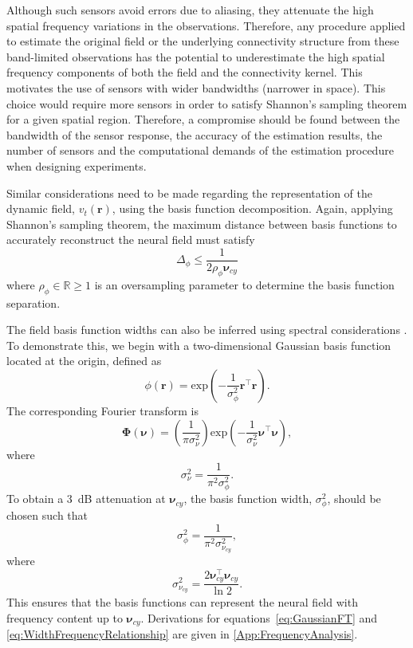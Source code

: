 \documentclass[review,authoryear,3p]{elsarticle}
\begin{document}
Although such sensors avoid errors due to aliasing, they attenuate the high spatial frequency variations in the observations. Therefore, any procedure applied to estimate the original field or the underlying connectivity structure from these band-limited observations has the potential to underestimate the high spatial frequency components of both the field and the connectivity kernel. This motivates the use of sensors with wider bandwidths (narrower in space). This choice would require more sensors in order to satisfy Shannon's sampling theorem for a given spatial region. Therefore, a compromise should be found between the bandwidth of the sensor response, the accuracy of the estimation results, the number of sensors and the computational demands of the estimation procedure when designing experiments.

Similar considerations need to be made regarding the representation of the dynamic field, $v_t(\mathbf{r})$, using the basis function decomposition. Again, applying Shannon's sampling theorem, the maximum distance between basis functions to accurately reconstruct the neural field must satisfy 
\begin{equation}\label{eq:BasisFunctionSeparation}
	\Delta_{\phi} \leq \frac{1}{2\rho_{\phi}\boldsymbol{\nu}_{cy}}
\end{equation}
where $\rho_{\phi} \in \mathbb{R} \ge 1$ is an oversampling parameter to determine the basis function separation. 

The field basis function widths can also be inferred using spectral considerations \citep{Sanner1992,Scerri2009}. To demonstrate this, we begin with a two-dimensional Gaussian basis function located at the origin, defined as
\begin{equation}\label{eq:BasisFunctionAtOrigin}
 \phi(\mathbf r)=\mathrm{exp}\left({-\frac{1}{\sigma_{\phi}^2} \mathbf r^\top\mathbf r}\right).
\end{equation}
The corresponding Fourier transform is
\begin{equation}\label{eq:GaussianFT}
\boldsymbol\Phi(\boldsymbol \nu)=\left(\frac{1}{\pi\sigma_{\nu}^2}\right)\mathrm{exp}\left(-\frac{1}{\sigma_{\nu}^2}\boldsymbol\nu^\top \boldsymbol\nu\right),
\end{equation}
where 
\begin{equation}\label{eq:GaussianFTWidth}
	\sigma^2_{\nu} = \frac{1}{\pi^2\sigma_{\phi}^2}. 
\end{equation}
To obtain a 3~dB attenuation at $\boldsymbol\nu_{cy}$, the basis function width, $\sigma^2_{\phi}$, should be chosen such that
\begin{equation}\label{eq:WidthCutOffRelationship}
 \sigma^2_{\phi}= \frac{1}{\pi^2\sigma_{\nu_{cy}}^2},
\end{equation}
where
\begin{equation}\label{eq:WidthFrequencyRelationship}
 \sigma^2_{\nu_{cy}}= \frac{2\boldsymbol\nu_{cy}^\top \boldsymbol\nu_{cy}}{\ln2}.
\end{equation}
This ensures that the basis functions can represent the neural field with frequency content up to $\boldsymbol\nu_{cy}$. Derivations for equations~\ref{eq:GaussianFT} and \ref{eq:WidthFrequencyRelationship} are given in \ref{App:FrequencyAnalysis}.
\end{document}
